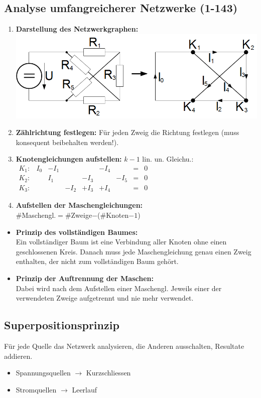 \documentclass[a4paper, 6pt, landscape]{scrartcl}
\begin{document}
\begin{multicols*}{4}
				\subsection{Analyse umfangreicherer Netzwerke (1-143)}
				\begin{enumerate}
					\item \textbf{Darstellung des Netzwerkgraphen:}\\
					\includegraphics[scale=0.2]{source/graph.png}
					\item \textbf{Zählrichtung festlegen:} Für jeden Zweig die Richtung festlegen (muss konsequent beibehalten werden!).
					\item \textbf{Knotengleichungen aufstellen:} $k-1$ lin. un. Gleichu.:\\
					$\begin{array}{lllllllll}
						K_1: & I_0 & -I_1 & & & -I_4 & & = & 0 \\
						K_2: & & I_1 & & -I_3 & & -I_5 & = & 0 \\
						K_3: & & & -I_2 & +I_3 & +I_4 & & = & 0
					\end{array}$
					\item \textbf{Aufstellen der Maschengleichungen:}\\
					\#Maschengl.$=$\#Zweige$-$(\#Knoten$-1$)
				\end{enumerate}
				\begin{itemize}
					\item \textbf{Prinzip des vollständigen Baumes:}\\
					Ein vollständiger Baum ist eine Verbindung aller Knoten ohne einen geschlossenen Kreis. Danach muss jede Maschengleichung genau einen Zweig enthalten, der nicht zum vollständigen Baum gehört.
					\item \textbf{Prinzip der Auftrennung der Maschen:}\\
					Dabei wird nach dem Aufstellen einer Maschengl. Jeweils einer der verwendeten Zweige aufgetrennt und nie mehr verwendet.
				\end{itemize}
				\subsection{Superpositionsprinzip}
				Für jede Quelle das Netzwerk analysieren, die Anderen ausschalten, Resultate addieren.
				\begin{itemize}
					\item Spannungsquellen $\rightarrow$ Kurzschliessen
					\item Stromquellen $\rightarrow$ Leerlauf
				\end{itemize}				
				

\end{multicols*}
\end{document}
